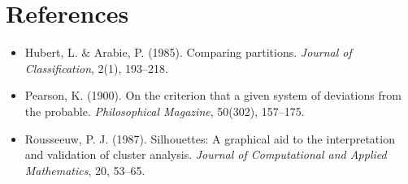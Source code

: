 \documentclass[11pt]{article}
\begin{document}
\section*{References}

\begin{itemize}[leftmargin=2em,itemsep=0.2em]
\item Hubert, L. \& Arabie, P. (1985). Comparing partitions. \emph{Journal of Classification}, 2(1), 193--218.
\item Pearson, K. (1900). On the criterion that a given system of deviations from the probable. \emph{Philosophical Magazine}, 50(302), 157--175.
\item Rousseeuw, P. J. (1987). Silhouettes: A graphical aid to the interpretation and validation of cluster analysis. \emph{Journal of Computational and Applied Mathematics}, 20, 53--65.
\end{itemize}
\end{document}
